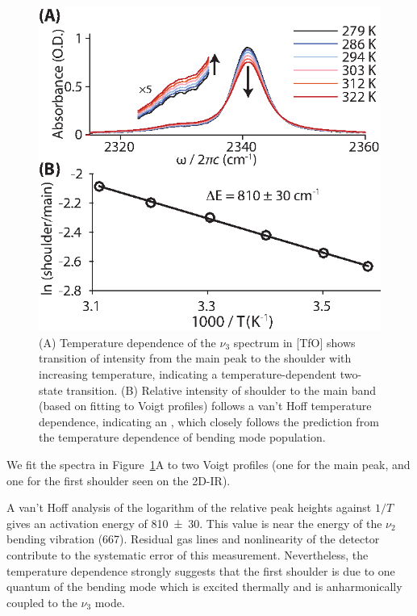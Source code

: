 \documentclass[%
  class = book,%
  crop = false,%
  float = true,%
  multi = true,%
  preview = false,%
]{standalone}
\begin{document}
{\begin{figure}
  \centering
  \includegraphics[scale=1.40]{fig3.eps}
  \caption[T-dependent FTIR of \texorpdfstring{}{carbon dioxide} in 1-butyl-3-methylimidazolium triflate]{\label{fig:hot band}(A) Temperature dependence of the \(\nu_3\) spectrum in \ce{[Im_{4,1}]}[TfO] shows transition of intensity from the main peak to the shoulder with increasing temperature, indicating a temperature-dependent two-state transition. (B) Relative intensity of shoulder to the main band (based on fitting to Voigt profiles) follows a van't Hoff temperature dependence, indicating an , which closely follows the prediction from the temperature dependence of bending mode population. }
\end{figure}

We fit the spectra in Figure~\ref{fig:hot band}A to two Voigt profiles (one for the main peak, and one for the first shoulder seen on the 2D-IR).

A van't Hoff analysis of the logarithm of the relative peak heights against \(1/T\) gives an activation energy of \SI{810(30)}{\wavenumber}. This value is near the energy of the \(\nu_2\) bending vibration (\SI{667}{\wavenumber}). Residual gas lines and nonlinearity of the detector contribute to the systematic error of this measurement. Nevertheless, the temperature dependence strongly suggests that the first shoulder is due to one quantum of the bending mode which is excited thermally and is anharmonically coupled to the \(\nu_3\) mode.

}
\end{document}
